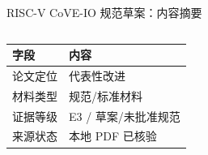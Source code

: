\begin{frame}[t,shrink=6]{RISC-V CoVE-IO 规范草案：内容摘要}
\begin{columns}[T,totalwidth=\textwidth]
\begin{column}{0.49\textwidth}
{\begin{minipage}[t]{0.97\linewidth}
\begin{minipage}{0.92\linewidth}
      \scriptsize {\tiny
\begin{tabularx}{\linewidth}{@{}YY@{}}
\toprule
\textbf{字段} & \textbf{内容} \\
\midrule
论文定位 & 代表性改进 \\
材料类型 & 规范/标准材料 \\
证据等级 & E3 / 草案/未批准规范 \\
来源状态 & 本地 PDF 已核验 \\
\bottomrule
\end{tabularx}
}
    \end{minipage}
    \vspace{1mm}
  \end{minipage}}
  \end{column}
\end{columns}
\end{frame}


